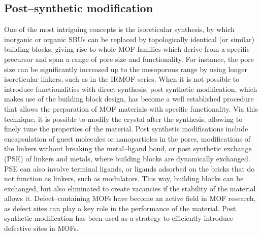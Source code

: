 \subsection{Post--synthetic modification}
One of the most intriguing concepts is the isoreticular synthesis, by which inorganic or organic SBUs can be replaced by topologically identical (or similar) building blocks, giving rise to whole MOF families which derive from a specific precursor and span a range of pore size and functionality. For instance, the pore size can be significantly increased up to the mesoporous range by using longer isoreticular linkers, such as in the IRMOF series\cite{eddaoudi2002systematic}. When it is not possible to introduce functionalities with direct synthesis, post synthetic modification\cite{wang2009postsynthetic}, which makes use of the building block design, has become a well established procedure that allows the preparation of MOF materials with specific functionality. Via this technique, it is possible to modify the crystal after the synthesis, allowing to finely tune the properties of the material. Post synthetic modifications include encapsulation of guest molecules or nanoparticles in the pores, modifications of the linkers without breaking the metal--ligand bond, or post synthetic exchange (PSE) of linkers and metals, where building blocks are dynamically exchanged. 
PSE can also involve terminal ligands, or ligands adsorbed on the bricks that do not function as linkers, such as modulators. This way, building blocks can be exchanged, but also eliminated to create vacancies if the stability of the material allows it. Defect--containing MOFs have become an active field in MOF research, as defect sites can play a key role in the performance of the material. Post synthetic modification has been used as a strategy to efficiently introduce defective sites in MOFs. 

